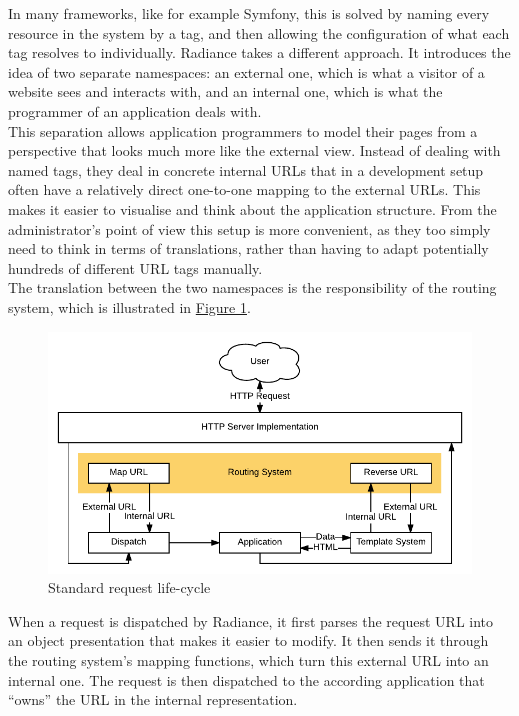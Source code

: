 \documentclass{sig-alternate}
\begin{document}
In many frameworks, like for example Symfony\cite{symfony}, this is solved by naming every resource in the system by a tag, and then allowing the configuration of what each tag resolves to individually. Radiance takes a different approach. It introduces the idea of two separate namespaces: an external one, which is what a visitor of a website sees and interacts with, and an internal one, which is what the programmer of an application deals with. \\

This separation allows application programmers to model their pages from a perspective that looks much more like the external view. Instead of dealing with named tags, they deal in concrete internal URLs that in a development setup often have a relatively direct one-to-one mapping to the external URLs. This makes it easier to visualise and think about the application structure. From the administrator's point of view this setup is more convenient, as they too simply need to think in terms of translations, rather than having to adapt potentially hundreds of different URL tags manually. \\

The translation between the two namespaces is the responsibility of the routing system, which is illustrated in \hyperref[requestcycle]{Figure 1}. \\

\begin{figure}[h]
  \includegraphics[width=\columnwidth]{request}
  \caption{Standard request life-cycle}
  \label{requestcycle}
\end{figure}

When a request is dispatched by Radiance, it first parses the request URL into an object presentation that makes it easier to modify. It then sends it through the routing system's mapping functions, which turn this external URL into an internal one. The request is then dispatched to the according application that ``owns'' the URL in the internal representation. \\
\end{document}
